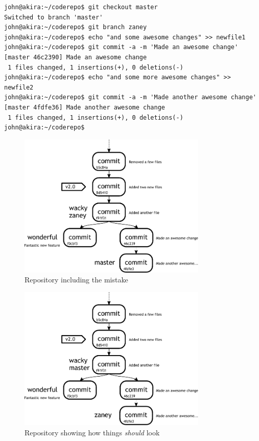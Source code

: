 \begin{Verbatim}[frame=leftline,framerule=1mm,fontsize=\relsize{-3}] 
john@akira:~/coderepo$ git checkout master
Switched to branch 'master'
john@akira:~/coderepo$ git branch zaney
john@akira:~/coderepo$ echo "and some awesome changes" >> newfile1
john@akira:~/coderepo$ git commit -a -m 'Made an awesome change'
[master 46c2390] Made an awesome change
 1 files changed, 1 insertions(+), 0 deletions(-)
john@akira:~/coderepo$ echo "and some more awesome changes" >> newfile2
john@akira:~/coderepo$ git commit -a -m 'Made another awesome change'
[master 4fdfe36] Made another awesome change
 1 files changed, 1 insertions(+), 0 deletions(-)
john@akira:~/coderepo$ 
\end{Verbatim}

\begin{figure}[hbt]
\centering
\includegraphics[width=9cm]{images/f-w4-d3.pdf}
\caption{Repository including the mistake}
\end{figure}

\begin{figure}[hbt]
\centering
\includegraphics[width=9cm]{images/f-w4-d4.pdf}
\caption{Repository showing how things \emph{should} look}
\end{figure}


